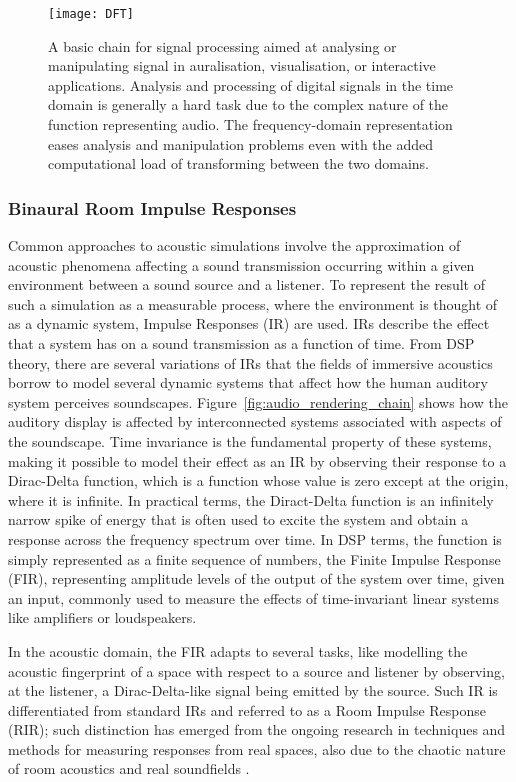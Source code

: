 \begin{figure}[htb]
    \centering
    \texttt{[image: DFT]}
    \caption{A basic chain for signal processing aimed at analysing or manipulating signal in auralisation, visualisation, or interactive applications. Analysis and processing of digital signals in the time domain is generally a hard task due to the complex nature of the function representing audio. The frequency-domain representation eases analysis and manipulation problems even with the added computational load of transforming between the two domains.}
    \label{fig:DFT}
\end{figure}

\subsubsection{Binaural Room Impulse Responses}\label{sec:ir-definition}
Common approaches to acoustic simulations involve the approximation of acoustic phenomena affecting a sound transmission occurring within a given environment between a sound source and a listener. To represent the result of such a simulation as a measurable process, where the environment is thought of as a dynamic system, Impulse Responses (IR) are used. IRs describe the effect that a system has on a sound transmission as a function of time. From DSP theory, there are several variations of IRs that the fields of immersive acoustics borrow to model several dynamic systems that affect how the human auditory system perceives soundscapes. Figure~\ref{fig:audio_rendering_chain} shows how the auditory display is affected by interconnected systems associated with aspects of the soundscape. Time invariance is the fundamental property of these systems, making it possible to model their effect as an IR by observing their response to a Dirac-Delta function, which is a function whose value is zero except at the origin, where it is infinite. In practical terms, the Diract-Delta function is an infinitely narrow spike of energy that is often used to excite the system and obtain a response across the frequency spectrum over time. In DSP terms, the function is simply represented as a finite sequence of numbers, the Finite Impulse Response (FIR), representing amplitude levels of the output of the system over time, given an input, commonly used to measure the effects of time-invariant linear systems like amplifiers or loudspeakers.\par
In the acoustic domain, the FIR adapts to several tasks, like modelling the acoustic fingerprint of a space with respect to a source and listener by observing, at the listener, a Dirac-Delta-like signal being emitted by the source. Such IR is differentiated from standard IRs and referred to as a Room Impulse Response (RIR); such distinction has emerged from the ongoing research in techniques and methods for measuring responses from real spaces, also due to the chaotic nature of room acoustics and real soundfields \citep{farina07}. 
